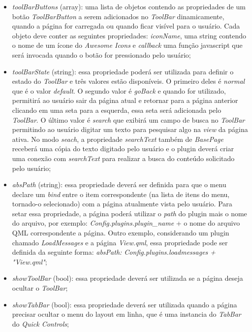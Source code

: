 \begin{itemize}
	\item \textit{toolBarButtons} (array): uma lista de objetos contendo as propriedades de um botão \textit{ToolBarButton} a serem adicionados no \textit{ToolBar} dinamicamente, quando a página for carregada ou quando ficar visível para o usuário. Cada objeto deve conter as seguintes propriedades: \textit{iconName}, uma string contendo o nome de um ícone do \textit{Awesome Icons} e \textit{callback} uma função javascript que será invocada quando o botão for pressionado pelo usuário;

	\item \textit{toolBarState} (string): essa propriedade poderá ser utilizada para definir o estado do \textit{ToolBar} e três valores estão disponíveis. O primeiro deles é \textit{normal} que é o valor \textit{default}. O segundo valor é \textit{goBack} e quando for utilizado, permitirá ao usuário sair da página atual e retornar para a página anterior clicando em uma seta para a esquerda, essa seta será adicionada pelo \textit{ToolBar}. O último valor é \textit{search} que exibirá um campo de busca no \textit{ToolBar} permitindo ao usuário digitar um texto para pesquisar algo na \textit{view} da página ativa. No modo \textit{seach}, a propriedade \textit{searchText} também de \textit{BasePage} receberá uma cópia do texto digitado pelo usuário e o plugin deverá criar uma conexão com \textit{searchText} para realizar a busca do conteúdo solicitado pelo usuário;

	\item \textit{absPath} (string): essa propriedade deverá ser definida para que o menu declare um \textit{bind} entre o item correspondente (na lista de itens do menu, tornado-o selecionado) com a página atualmente vista pelo usuário. Para setar essa propriedade, a página poderá utilizar o \textit{path} do plugin mais o nome do arquivo, por exemplo: \textit{Config.plugins.plugin\_name} + o nome do arquivo QML correspondente a página. Outro exemplo, considerando um plugin chamado \textit{LoadMessages} e a página \textit{View.qml}, essa propriedade pode ser definida da seguinte forma: \textit{absPath: Config.plugins.loadmessages + "View.qml"};

	\item \textit{showToolBar} (bool): essa propriedade deverá ser utilizada se a página deseja ocultar o \textit{ToolBar};

	\item \textit{showTabBar} (bool): essa propriedade deverá ser utilizada quando a página precisar ocultar o menu do layout em linha, que é uma instancia do \textit{TabBar} do \textit{Quick Controls};


\end{itemize}
